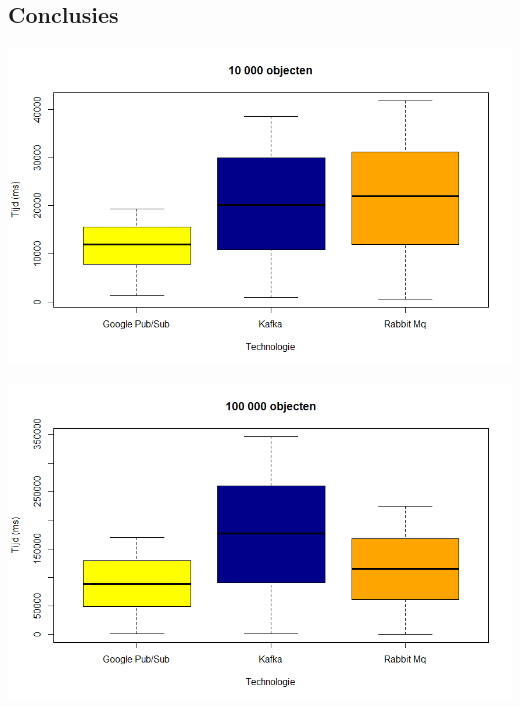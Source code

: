 \documentclass[a0,portrait]{a0poster}
\begin{document}
\begin{multicols}{2}
\section*{Conclusies}
\color{black}
\begin{center}\vspace{1cm}
    \includegraphics[width=200mm]{10000Boxplot}
\end{center}\vspace{1cm}
\begin{center}\vspace{1cm}
    \includegraphics[width=200mm]{100000Boxplot}
\end{center}\vspace{1cm}
\begin{center}\vspace{1cm}

\end{center}
\end{multicols}
\end{document}
